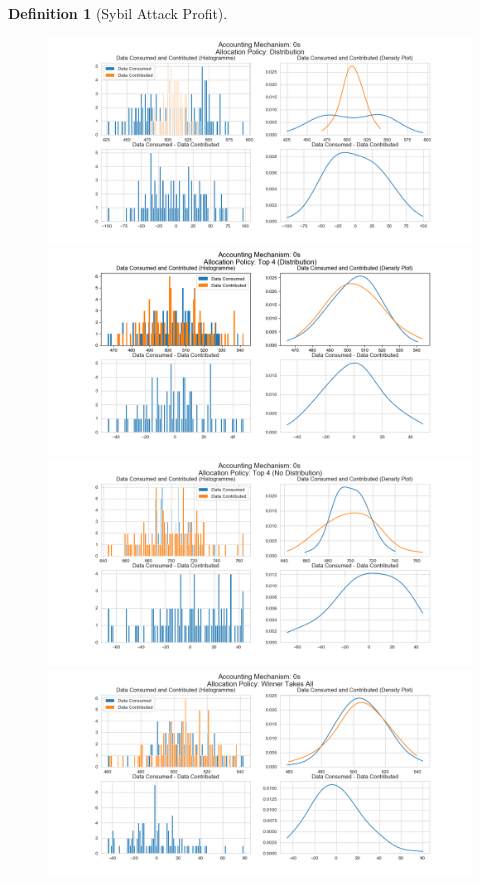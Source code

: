 \documentclass[11pt,a4paper]{article}
\theoremstyle{definition}
\newtheorem{definition}{Definition}[section]
\theoremstyle{theorem}
\theoremstyle{proposition}
\theoremstyle{corollary}
\theoremstyle{lemma}
\theoremstyle{example}
\theoremstyle{remark}
\begin{document}
\begin{definition}[Sybil Attack Profit]
\begin{figure}[H]
\begin{center}
\includegraphics[scale=0.4]{Acc_0s_Dist.png}
\includegraphics[scale=0.4]{Acc_0s_Top_4_Dist.png}
\includegraphics[scale=0.4]{Acc_0s_Top_4_No_Dist.png}
\includegraphics[scale=0.4]{Acc_0s_Winner.png}
\end{center}
\end{figure}


\end{definition}
\end{document}
